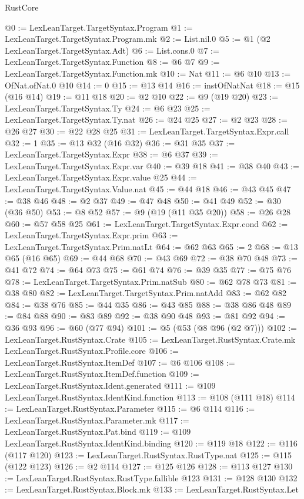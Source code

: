 \begin{lexlean}{RustCore}
\begin{coremodule}
@0 := LexLeanTarget.TargetSyntax.Program
@1 := LexLeanTarget.TargetSyntax.Program.mk
@2 := List.nil.{0}
@5 := @1 (@2 LexLeanTarget.TargetSyntax.Adt)
@6 := List.cons.{0}
@7 := LexLeanTarget.TargetSyntax.Function
@8 := @6 @7
@9 := LexLeanTarget.TargetSyntax.Function.mk
@10 := Nat
@11 := @6 @10
@13 := OfNat.ofNat.{0} @10
@14 := 0
@15 := @13 @14
@16 := instOfNatNat
@18 := @15 (@16 @14)
@19 := @11 @18
@20 := @2 @10
@22 := @9 (@19 @20)
@23 := LexLeanTarget.TargetSyntax.Ty
@24 := @6 @23
@25 := LexLeanTarget.TargetSyntax.Ty.nat
@26 := @24 @25
@27 := @2 @23
@28 := @26 @27
@30 := @22 @28 @25
@31 := LexLeanTarget.TargetSyntax.Expr.call
@32 := 1
@35 := @13 @32 (@16 @32)
@36 := @31 @35
@37 := LexLeanTarget.TargetSyntax.Expr
@38 := @6 @37
@39 := LexLeanTarget.TargetSyntax.Expr.var
@40 := @39 @18
@41 := @38 @40
@43 := LexLeanTarget.TargetSyntax.Expr.value @25
@44 := LexLeanTarget.TargetSyntax.Value.nat
@45 := @44 @18
@46 := @43 @45
@47 := @38 @46
@48 := @2 @37
@49 := @47 @48
@50 := @41 @49
@52 := @30 (@36 @50)
@53 := @8 @52
@57 := @9 (@19 (@11 @35 @20))
@58 := @26 @28
@60 := @57 @58 @25
@61 := LexLeanTarget.TargetSyntax.Expr.cond
@62 := LexLeanTarget.TargetSyntax.Expr.prim
@63 := LexLeanTarget.TargetSyntax.Prim.natLt
@64 := @62 @63
@65 := 2
@68 := @13 @65 (@16 @65)
@69 := @44 @68
@70 := @43 @69
@72 := @38 @70 @48
@73 := @41 @72
@74 := @64 @73
@75 := @61 @74
@76 := @39 @35
@77 := @75 @76
@78 := LexLeanTarget.TargetSyntax.Prim.natSub
@80 := @62 @78 @73
@81 := @38 @80
@82 := LexLeanTarget.TargetSyntax.Prim.natAdd
@83 := @62 @82
@84 := @38 @76
@85 := @44 @35
@86 := @43 @85
@88 := @38 @86 @48
@89 := @84 @88
@90 := @83 @89
@92 := @38 @90 @48
@93 := @81 @92
@94 := @36 @93
@96 := @60 (@77 @94)
@101 := @5 (@53 (@8 @96 (@2 @7)))
@102 := LexLeanTarget.RustSyntax.Crate
@105 := LexLeanTarget.RustSyntax.Crate.mk LexLeanTarget.RustSyntax.Profile.core
@106 := LexLeanTarget.RustSyntax.ItemDef
@107 := @6 @106
@108 := LexLeanTarget.RustSyntax.ItemDef.function
@109 := LexLeanTarget.RustSyntax.Ident.generated
@111 := @109 LexLeanTarget.RustSyntax.IdentKind.function
@113 := @108 (@111 @18)
@114 := LexLeanTarget.RustSyntax.Parameter
@115 := @6 @114
@116 := LexLeanTarget.RustSyntax.Parameter.mk
@117 := LexLeanTarget.RustSyntax.Pat.bind
@119 := @109 LexLeanTarget.RustSyntax.IdentKind.binding
@120 := @119 @18
@122 := @116 (@117 @120)
@123 := LexLeanTarget.RustSyntax.RustType.nat
@125 := @115 (@122 @123)
@126 := @2 @114
@127 := @125 @126
@128 := @113 @127
@130 := LexLeanTarget.RustSyntax.RustType.fallible @123
@131 := @128 @130
@132 := LexLeanTarget.RustSyntax.Block.mk
@133 := LexLeanTarget.RustSyntax.Let

\end{coremodule}
\end{lexlean}
